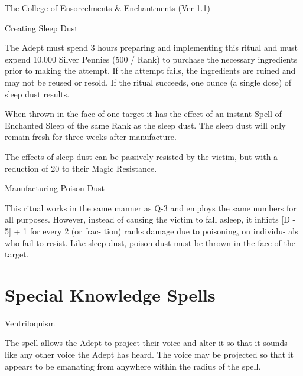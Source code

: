\begin{Chapter}{The College of Ensorcelments \& Enchantments (Ver 1.1)}
\begin{ritual}[Q-3]{Creating Sleep Dust}

\begin{effects}
The Adept must spend 3 hours preparing and implementing this ritual
and must expend 10,000 Silver Pennies (500 / Rank) to purchase the
necessary ingredients prior to making the attempt.  If the attempt
fails, the ingredients are ruined and may not be reused or resold. If
the ritual succeeds, one ounce (a single dose) of sleep dust results.

When thrown in the face of one target it has the effect of an instant
Spell of Enchanted Sleep of the same Rank as the sleep dust.  The
sleep dust will only remain fresh for three weeks after manufacture.

The effects of sleep dust can be passively resisted by the victim, but
with a reduction of 20 to their Magic Resistance.
\end{effects}
\end{ritual}

\begin{ritual}[Q-4]{Manufacturing Poison Dust}
\begin{effects}
This ritual works in the same manner as Q-3 and employs the same
numbers for all purposes.  However, instead of causing the victim to
fall asleep, it inflicts [D - 5] + 1 for every 2 (or frac- tion) ranks
damage due to poisoning, on individu- als who fail to resist.  Like
sleep dust, poison dust must be thrown in the face of the target.
\end{effects}
\end{ritual}


\section{Special Knowledge Spells}


\begin{spell}[S-1]{Ventriloquism}
\begin{effects}
The spell allows the Adept to project their voice and alter it so that
it sounds like any other voice the Adept has heard. The voice may be
projected so that it appears to be emanating from anywhere within the
radius of the spell.
\end{effects}
\end{spell}


\end{Chapter}
